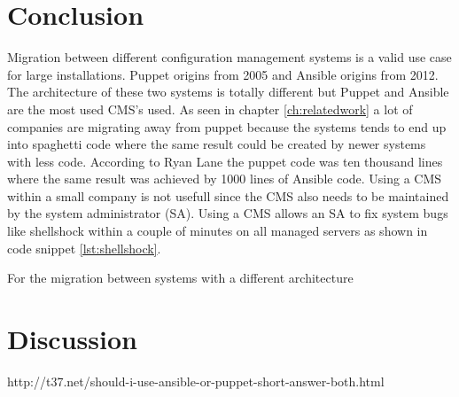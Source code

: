 \section{Conclusion}\label{sec:conclusion}
Migration between different configuration management systems is a valid use case for large installations. Puppet origins from 2005 and Ansible origins from 2012. The architecture of these two systems is totally different but Puppet and Ansible are the most used CMS's used. As seen in chapter \ref{ch:relatedwork} a lot of companies are migrating away from puppet because the systems tends to end up into spaghetti code \cite{movingawayfrompuppet} where the same result could be created by newer systems with less code. According to Ryan Lane \cite{movingawayfrompuppet} the puppet code was ten thousand lines where the same result was achieved by 1000 lines of Ansible code. Using a CMS within a small company is not usefull since the CMS also needs to be maintained by the system administrator (SA). Using a CMS allows an SA to fix system bugs like shellshock within a couple of minutes on all managed servers as shown in code snippet \ref{lst:shellshock}.

For the migration between systems with a different architecture




\section{Discussion}\label{sec:discussion}
http://t37.net/should-i-use-ansible-or-puppet-short-answer-both.html
